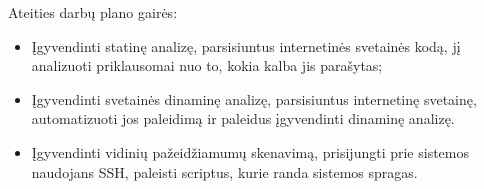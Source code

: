\documentclass[a4paper,12pt,fleqn]{article}
\begin{document}




Ateities darbų plano gairės:

\begin{itemize}
	\item Įgyvendinti statinę analizę, parsisiuntus internetinės svetainės kodą, jį analizuoti priklausomai nuo to, kokia kalba jis parašytas;
	\item Įgyvendinti svetainės dinaminę analizę, parsisiuntus internetinę svetainę, automatizuoti jos paleidimą ir paleidus įgyvendinti dinaminę analizę.
	\item Įgyvendinti vidinių pažeidžiamumų skenavimą, prisijungti prie sistemos naudojans SSH, paleisti scriptus, kurie randa sistemos spragas.
\end{itemize}


%



\end{document}
